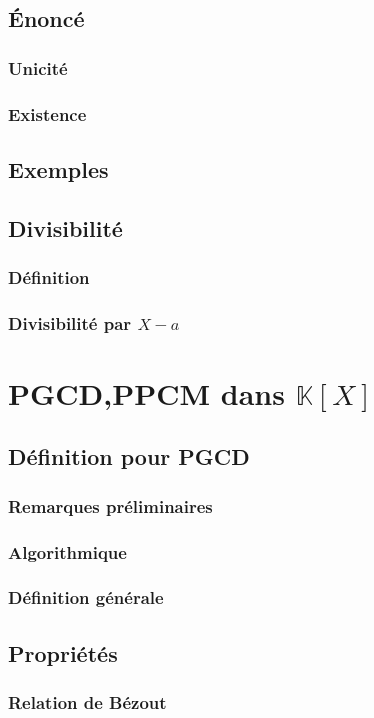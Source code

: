 \documentclass[12pt,a4paper,french]{book}
\begin{document}
		\subsection{Énoncé}
			\subsubsection{Unicité}
			\subsubsection{Existence}
		\subsection{Exemples}
		\subsection{Divisibilité}
			\subsubsection{Définition}
			\subsubsection{Divisibilité par $X-a$}
	\section{PGCD,PPCM dans $\mathbb{K}[X]$}
		\subsection{Définition pour PGCD}
			\subsubsection{Remarques préliminaires}
			\subsubsection{Algorithmique}
			\subsubsection{Définition générale}
		\subsection{Propriétés}
			\subsubsection{Relation de Bézout}
\end{document}
